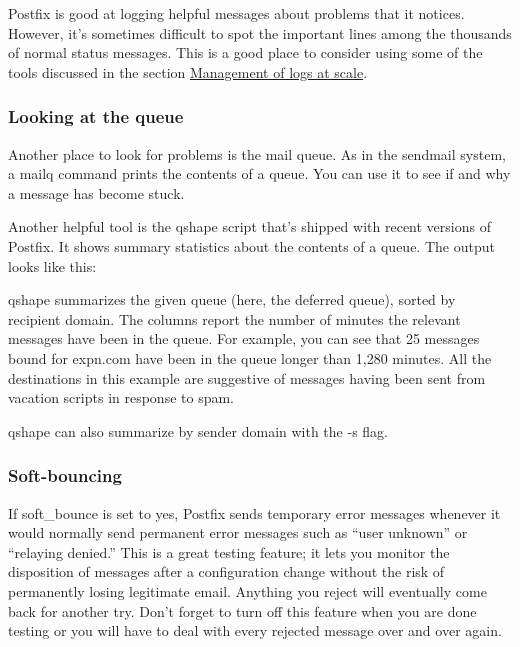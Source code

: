 Postfix is good at logging helpful messages about problems that it
notices. However, it's sometimes difficult to spot the important lines
among the thousands of normal status messages. This is a good place to
consider using some of the tools discussed in the section
\protect\hyperlink{part0017_split_020.htmlux5cux23_idTextAnchor533}{{Management
of logs at scale}}.

\subsubsection[Looking at the
queue]{\texorpdfstring{\protect\hypertarget{part0026_split_064.htmlux5cux23_idTextAnchor1196}{}{}Looking
at the queue}{Looking at the queue}}

Another place to look for problems is the mail queue. As in the
{sendmail} system, a
\protect\hypertarget{part0026_split_064.htmlux5cux23_idIndexMarker2740}{}{}{mailq}
command prints the contents of a queue. You can use it to see if and why
a message has become stuck.

Another helpful tool is the {qshape} script that's shipped with recent
versions of Postfix. It shows summary statistics about the contents of a
queue. The output looks like this:


{\protect\hypertarget{part0026_split_064.htmlux5cux23_idIndexMarker2741}{}{}}{qshape}
summarizes the given queue (here, the deferred queue), sorted by
recipient domain. The columns report the number of minutes the relevant
messages have been in the queue. For example, you can see that 25
messages bound for expn.com have been in the queue longer than 1,280
minutes. All the destinations in this example are suggestive of messages
having been sent from vacation scripts in response to spam.

{qshape} can also summarize by sender domain with the {-s} flag.

\subsubsection[Soft-bouncing]{\texorpdfstring{\protect\hypertarget{part0026_split_064.htmlux5cux23_idTextAnchor1197}{}{}Soft-bouncing}{Soft-bouncing}}

\protect\hypertarget{part0026_split_064.htmlux5cux23_idIndexMarker2742}{}{}If
\protect\hypertarget{part0026_split_064.htmlux5cux23_idIndexMarker2743}{}{}{soft\_bounce}
is set to {yes}, Postfix sends temporary error messages whenever it
would normally send permanent error messages such as ``user unknown'' or
``relaying denied.'' This is a great testing feature; it lets you
monitor the disposition of messages after a configuration change without
the risk of permanently losing legitimate email. Anything you reject
will eventually come back for another try. Don't forget to turn off this
feature when you are done testing or you will have to deal with every
rejected message over and over again.

